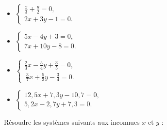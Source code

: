 \documentclass[12 pt]{report}
\theoremstyle{plain}
\newcounter{n}
\newcommand\ds\displaystyle
\newenvironment{calcul}{\item[$\mathbf{\then}.$] \stepcounter{n}\hfil $\displaystyle  }{.$\hfil   }
\begin{document}
 \begin{itemize}
 \begin{calcul} \left\{\begin{array}{l}\ds\frac{x}3 + \frac{y}2 = 0, \\ 
 2x + 3y - 1 = 0. \end{array}\right \end{calcul}
 
 \begin{calcul} \left\{\begin{array}{l}5x - 4y + 3 = 0, \\ 
7x + 10 y - 8 = 0. \end{array}\right \end{calcul}
 \begin{calcul} \left\{\begin{array}{l}\frac23 x - \frac54 y + \frac35 = 0, \\ 
 \ \frac37x + \frac53y - \frac34 = 0. \end{array}\right \end{calcul}
 \begin{calcul} \left\{\begin{array}{l}12,5x  + 7,3 y - 10,7= 0, \\ 
5,2x-2,7y+7,3= 0. \end{array}\right \end{calcul}
 \end{itemize}
 Résoudre les systèmes suivants aux inconnues $x$ et $y$ : 
\end{document}
